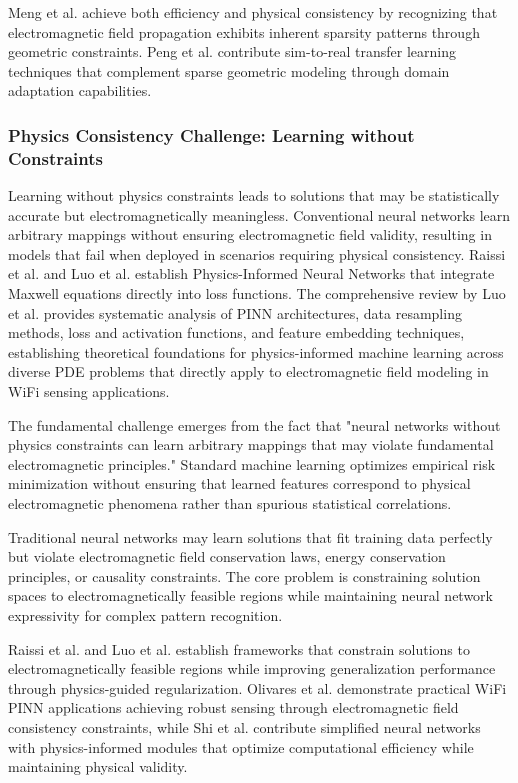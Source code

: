 \documentclass[journal]{IEEEtran}
\begin{document}
Meng et al. achieve both efficiency and physical consistency by recognizing that electromagnetic field propagation exhibits inherent sparsity patterns through geometric constraints. Peng et al. \cite{peng2018sim} contribute sim-to-real transfer learning techniques that complement sparse geometric modeling through domain adaptation capabilities.

\subsubsection{Physics Consistency Challenge: Learning without Constraints}

Learning without physics constraints leads to solutions that may be statistically accurate but electromagnetically meaningless. Conventional neural networks learn arbitrary mappings without ensuring electromagnetic field validity, resulting in models that fail when deployed in scenarios requiring physical consistency. Raissi et al. \cite{raissi2019physics} and Luo et al. \cite{luo2025physics} establish Physics-Informed Neural Networks that integrate Maxwell equations directly into loss functions. The comprehensive review by Luo et al. provides systematic analysis of PINN architectures, data resampling methods, loss and activation functions, and feature embedding techniques, establishing theoretical foundations for physics-informed machine learning across diverse PDE problems that directly apply to electromagnetic field modeling in WiFi sensing applications.

The fundamental challenge emerges from the fact that "neural networks without physics constraints can learn arbitrary mappings that may violate fundamental electromagnetic principles." Standard machine learning optimizes empirical risk minimization without ensuring that learned features correspond to physical electromagnetic phenomena rather than spurious statistical correlations.

Traditional neural networks may learn solutions that fit training data perfectly but violate electromagnetic field conservation laws, energy conservation principles, or causality constraints. The core problem is constraining solution spaces to electromagnetically feasible regions while maintaining neural network expressivity for complex pattern recognition.

Raissi et al. and Luo et al. establish frameworks that constrain solutions to electromagnetically feasible regions while improving generalization performance through physics-guided regularization. Olivares et al. \cite{olivares2021applications} demonstrate practical WiFi PINN applications achieving robust sensing through electromagnetic field consistency constraints, while Shi et al. \cite{shi2023simplified} contribute simplified neural networks with physics-informed modules that optimize computational efficiency while maintaining physical validity.
\end{document}

